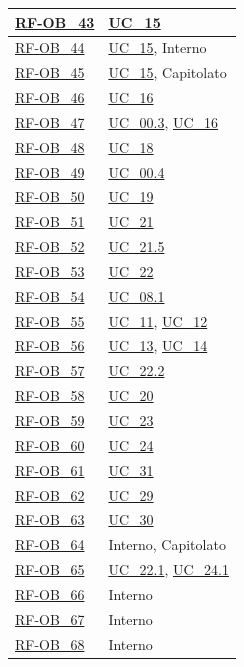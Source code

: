 \begin{longtable}{|>{\raggedright}p{}|>{\raggedright\arraybackslash}p{}|}
    \hyperlink{rf-ob_43}{RF-OB\_43} & \hyperref[uc_15]{UC\_15} \\ \hline
    \hyperlink{rf-ob_44}{RF-OB\_44} & \hyperref[uc_15]{UC\_15}, Interno \\ \hline
    \hyperlink{rf-ob_45}{RF-OB\_45} & \hyperref[uc_15]{UC\_15}, Capitolato \\ \hline
    \hyperlink{rf-ob_46}{RF-OB\_46} & \hyperref[uc_16]{UC\_16} \\ \hline
    \hyperlink{rf-ob_47}{RF-OB\_47} & \hyperref[uc_00.3]{UC\_00.3}, \hyperref[uc_16]{UC\_16} \\ \hline
    \hyperlink{rf-ob_48}{RF-OB\_48} & \hyperref[uc_18]{UC\_18} \\ \hline
    \hyperlink{rf-ob_49}{RF-OB\_49} & \hyperref[uc_00.4]{UC\_00.4} \\ \hline
    \hyperlink{rf-ob_50}{RF-OB\_50} & \hyperref[uc_19]{UC\_19} \\ \hline
    \hyperlink{rf-ob_51}{RF-OB\_51} & \hyperref[uc_21]{UC\_21} \\ \hline
    \hyperlink{rf-ob_52}{RF-OB\_52} & \hyperref[uc_21.5]{UC\_21.5} \\ \hline
    \hyperlink{rf-ob_53}{RF-OB\_53} & \hyperref[uc_22]{UC\_22} \\ \hline
    \hyperlink{rf-ob_54}{RF-OB\_54} & \hyperref[uc_08.1]{UC\_08.1} \\ \hline
    \hyperlink{rf-ob_55}{RF-OB\_55} & \hyperref[uc_11]{UC\_11}, \hyperref[uc_12]{UC\_12} \\ \hline
    \hyperlink{rf-ob_56}{RF-OB\_56} & \hyperref[uc_13]{UC\_13}, \hyperref[uc_14]{UC\_14} \\ \hline
    \hyperlink{rf-ob_57}{RF-OB\_57} & \hyperref[uc_22.2]{UC\_22.2} \\ \hline
    \hyperlink{rf-ob_58}{RF-OB\_58} & \hyperref[uc_20]{UC\_20} \\ \hline
    \hyperlink{rf-ob_59}{RF-OB\_59} & \hyperref[uc_23]{UC\_23} \\ \hline
    \hyperlink{rf-ob_60}{RF-OB\_60} & \hyperref[uc_24]{UC\_24} \\ \hline
    \hyperlink{rf-ob_61}{RF-OB\_61} & \hyperref[uc_31]{UC\_31} \\ \hline
    \hyperlink{rf-ob_62}{RF-OB\_62} & \hyperref[uc_29]{UC\_29} \\ \hline
    \hyperlink{rf-ob_63}{RF-OB\_63} & \hyperref[uc_30]{UC\_30} \\ \hline
    \hyperlink{rf-ob_64}{RF-OB\_64} & Interno, Capitolato \\ \hline
    \hyperlink{rf-ob_65}{RF-OB\_65} & \hyperref[uc_22.1]{UC\_22.1}, \hyperref[uc_24.1]{UC\_24.1} \\ \hline
    \hyperlink{rf-ob_66}{RF-OB\_66} & Interno \\ \hline
    \hyperlink{rf-ob_67}{RF-OB\_67} & Interno \\ \hline
    \hyperlink{rf-ob_68}{RF-OB\_68} & Interno \\ \hline
    

\end{longtable}
